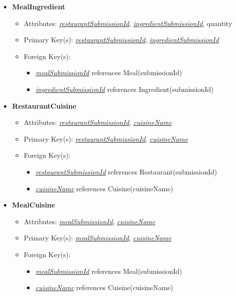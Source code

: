 \begin{itemize}
        \item \textbf{MealIngredient}
        \begin{itemize}
            \item Attributes: \underline{\textit{restaurantSubmissionId}}, \underline{\textit{ingredientSubmissionId}}, quantity
            \item Primary Key(s): \underline{\textit{restaurantSubmissionId}}, \underline{\textit{ingredientSubmissionId}}
            \item Foreign Key(s): 
                \begin{itemize}
                    \item \underline{\textit{mealSubmissionId}} references Meal(submissionId)
                    \item \underline{\textit{ingredientSubmissionId}} references Ingredient(submissionId)
                \end{itemize}   
        \end{itemize}

        \item \textbf{RestaurantCuisine}
        \begin{itemize}
            \item Attributes: \underline{\textit{restaurantSubmissionId}}, \underline{\textit{cuisineName}}
            \item Primary Key(s): \underline{\textit{restaurantSubmissionId}}, \underline{\textit{cuisineName}}
            \item Foreign Key(s): 
                \begin{itemize}
                    \item \underline{\textit{restaurantSubmissionId}} references Restaurant(submissionId)
                    \item \underline{\textit{cuisineName}} references Cuisine(cuisineName)
                \end{itemize}   
        \end{itemize}

        \item \textbf{MealCuisine}
        \begin{itemize}
            \item Attributes: \underline{\textit{mealSubmissionId}}, \underline{\textit{cuisineName}}
            \item Primary Key(s): \underline{\textit{mealSubmissionId}}, \underline{\textit{cuisineName}}
            \item Foreign Key(s): 
                \begin{itemize}
                    \item \underline{\textit{mealSubmissionId}} references Meal(submissionId)
                    \item \underline{\textit{cuisineName}} references Cuisine(cuisineName)
                \end{itemize}   
        \end{itemize}
    \end{itemize}